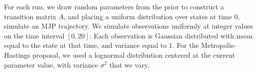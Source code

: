 For each run, we draw random parameters from the prior to construct a transition matrix $A$, and placing a uniform distribution over states at time $0$, simulate an MJP trajectory.
We simulate observations uniformly at integer values on the time interval $[0, 20]$. 
Each observation is Gaussian distributed with mean equal to the state
at that time, and variance equal to $1$.  
For the Metropolis-Hastings proposal, we used a lognormal distribution centered at the current parameter value, with variance $\sigma^2$ that we vary.

